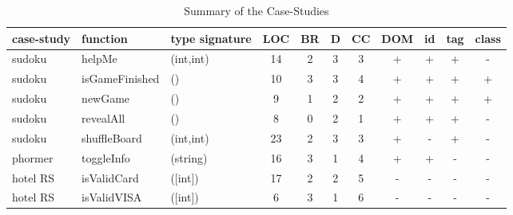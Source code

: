 \documentclass[sigconf,review]{acmart}
\begin{document}
\setlength\tabcolsep{1pt}
\begin{table}[!t]
  \caption{Summary of the Case-Studies}
  \label{tbl.case.studies}
    \scriptsize
  \begin{tabular}{l|l|p{2.7cm}|c|c|c|c|c|c|c|c}
    \toprule
    \textbf{case-study} & \textbf{function} & \textbf{type signature} & \textbf{LOC} & \textbf{BR} & \textbf{D} & \textbf{CC} & \textbf{DOM} & \textbf{id} & \textbf{tag} & \textbf{class} \\
    \hline
    sudoku     & helpMe & (int,int)    & 14 & 2 & 3 & 3 & + & + & + & - \\
    sudoku     & isGameFinished & ()    & 10 & 3 & 3 & 4 & + & + & + & + \\
    sudoku     & newGame & ()           & 9  & 1 & 2 & 2 & + & + & + & + \\
    sudoku     & revealAll & ()         & 8  & 0 & 2 & 1 & + & + & + & - \\
    sudoku     & shuffleBoard & (int,int)      & 23 & 2 & 3 & 3 & + & - & + & - \\
    \hline
    phormer    & toggleInfo & (string)                                                     & 16 & 3 & 1 & 4 & + & + & - & - \\
    \hline
    hotel RS   & isValidCard & ([int])           & 17 & 2 & 2 & 5 & - & - & - & - \\
    hotel RS   & isValidVISA & ([int])           & 6  & 3 & 1 & 6 & - & - & - & - \\

\end{tabular}
\end{table}
\end{document}
